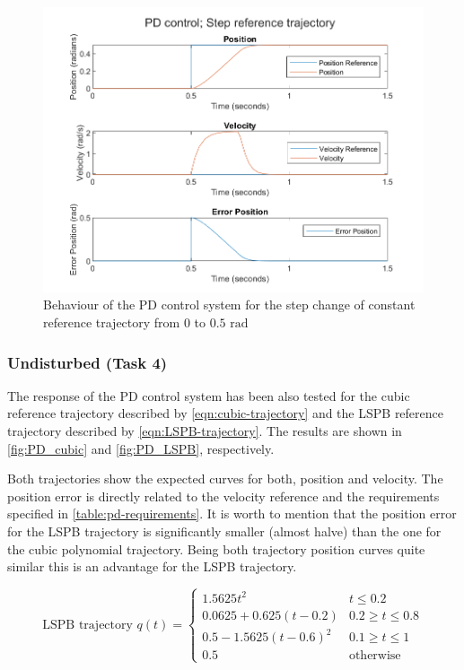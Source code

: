 \begin{figure}
    \centering
    \includegraphics[width=.7\textwidth]{PD_step.png}
    \caption{Behaviour of the PD control system for the step change of constant reference trajectory from $0$ to $0.5\text{ rad}$}
    \label{fig:PD_step}
\end{figure}

\subsubsection{Undisturbed (Task 4)}
\label{subsubsec:pd-undisturbed}
The response of the PD control system has been also tested for the cubic
reference trajectory described by \autoref{eqn:cubic-trajectory} and the LSPB
\cite{TrajGener} reference trajectory described by
\autoref{eqn:LSPB-trajectory}. The results are shown in \autoref{fig:PD_cubic}
and \autoref{fig:PD_LSPB}, respectively.

Both trajectories show the expected curves for both, position and velocity. The
position error is directly related to the velocity reference and the
requirements specified in \autoref{table:pd-requirements}. It is worth to
mention that the position error for the LSPB trajectory is significantly
smaller (almost halve) than the one for the cubic polynomial trajectory. Being
both trajectory position curves quite similar this is an advantage for the LSPB
trajectory.

\begin{equation}
    \text{LSPB trajectory } q(t) = 
    \begin{cases}
        1.5625 t^2 & t \leq 0.2 \\
        0.0625 + 0.625 (t-0.2) & 0.2 \geq t \leq 0.8 \\
        0.5 - 1.5625 (t-0.6)^2 & 0.1 \geq t \leq 1 \\
        0.5 & \text{otherwise}
    \end{cases}
    \label{eqn:LSPB-trajectory}
\end{equation}


